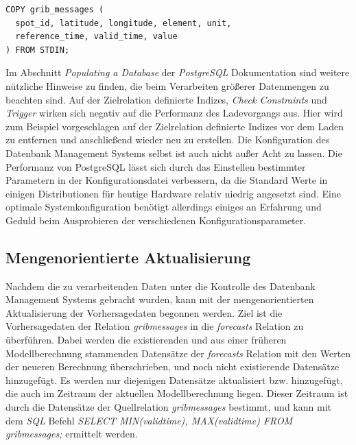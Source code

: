 \begin{lstlisting}[captionpos=b, caption=Befehl zum Import von Datensätzen in \textit{PostgreSQL}, label=lst:copy]
COPY grib_messages (
  spot_id, latitude, longitude, element, unit, 
  reference_time, valid_time, value
) FROM STDIN;
\end{lstlisting}

Im Abschnitt \textit{Populating a Database} \cite{postgresql:populate}
der \textit{PostgreSQL} Dokumentation sind weitere nützliche Hinweise
zu finden, die beim Verarbeiten größerer Datenmengen zu beachten
sind. Auf der Zielrelation definierte Indizes, \textit{Check
  Constraints} und \textit{Trigger} wirken sich negativ auf die
Performanz des Ladevorgangs aus. Hier wird zum Beispiel vorgeschlagen
auf der Zielrelation definierte Indizes vor dem Laden zu entfernen und
anschließend wieder neu zu erstellen. Die Konfiguration des Datenbank
Management Systems selbst ist auch nicht außer Acht zu lassen. Die
Performanz von PostgreSQL lässt sich durch das Einstellen bestimmter
Parametern in der Konfigurationsdatei verbessern, da die Standard
Werte in einigen Distributionen für heutige Hardware relativ niedrig
angesetzt sind. Eine optimale Systemkonfiguration benötigt allerdings
einiges an Erfahrung und Geduld beim Ausprobieren der verschiedenen
Konfigurationsparameter.

\subsection{Mengenorientierte Aktualisierung}
Nachdem die zu verarbeitenden Daten unter die Kontrolle des Datenbank
Management Systems gebracht wurden, kann mit der mengenorientierten
Aktualisierung der Vorhersagedaten begonnen werden. Ziel ist die
Vorhersagedaten der Relation \textit{grib\textunderscore messages} in
die \textit{forecasts} Relation zu überführen. Dabei werden die
existierenden und aus einer früheren Modellberechnung stammenden
Datensätze der \textit{forecasts} Relation mit den Werten der neueren
Berechnung überschrieben, und noch nicht existierende Datensätze
hinzugefügt. Es werden nur diejenigen Datensätze aktualisiert bzw.
hinzugefügt, die auch im Zeitraum der aktuellen Modellberechnung
liegen. Dieser Zeitraum ist durch die Datensätze der Quellrelation
\textit{grib\textunderscore messages} bestimmt, und kann mit dem
\textit{SQL} Befehl \textit{SELECT MIN(valid\textunderscore time),
  MAX(valid\textunderscore time) FROM grib\textunderscore messages;}
ermittelt werden.

